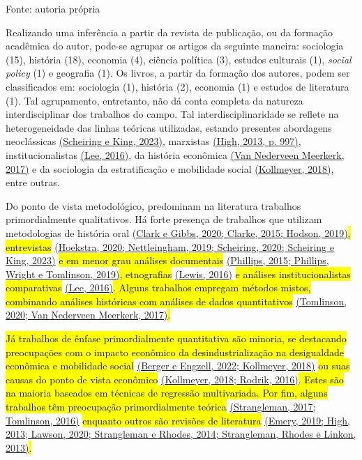 Fonte: autoria própria

Realizando uma inferência a partir da revista de publicação, ou da
formação acadêmica do autor, pode-se agrupar os artigos da seguinte
maneira: sociologia (15), história (18), economia (4), ciência política
(3), estudos culturais (1), \emph{social policy} (1) e geografia (1). Os
livros, a partir da formação dos autores, podem ser classificados em:
sociologia (1), história (2), economia (1) e estudos de literatura (1).
Tal agrupamento, entretanto, não dá conta completa da natureza
interdisciplinar dos trabalhos do campo. Tal interdisciplinaridade se
reflete na heterogeneidade das linhas teóricas utilizadas, estando
presentes abordagens neoclássicas
\href{https://www.zotero.org/google-docs/?kkP1z2}{(Scheiring e King,
2023)}, marxistas
\href{https://www.zotero.org/google-docs/?t9NhX6}{(High, 2013, p. 997)},
institucionalistas
\href{https://www.zotero.org/google-docs/?VlDdus}{(Lee, 2016)}, da
história econômica
\href{https://www.zotero.org/google-docs/?TRqrV5}{(Van Nederveen
Meerkerk, 2017)} e da sociologia da estratificação e mobilidade social
\href{https://www.zotero.org/google-docs/?MEPAJj}{(Kollmeyer, 2018)},
entre outras.

Do ponto de vista metodológico, predominam na literatura trabalhos
primordialmente qualitativos. Há forte presença de trabalhos que
utilizam metodologias de história oral
\href{https://www.zotero.org/google-docs/?cIWlm8}{(Clark e Gibbs, 2020;
Clarke, 2015; Hodson, 2019)}\hl{, entrevistas}
\href{https://www.zotero.org/google-docs/?u1rytv}{(Hoekstra, 2020;
Nettleingham, 2019; Scheiring, 2020; Scheiring e King, 2023)} \hl{e em
menor grau análises documentais}
\href{https://www.zotero.org/google-docs/?kgYUU2}{(Phillips, 2015;
Phillips, Wright e Tomlinson, 2019)}\hl{, etnografias}
\href{https://www.zotero.org/google-docs/?yB9B2v}{(Lewis, 2016)} \hl{e
análises institucionalistas comparativas}
\href{https://www.zotero.org/google-docs/?rZVpjC}{(Lee, 2016)}\hl{.
Alguns trabalhos empregam métodos mistos, combinando análises históricas
com análises de dados quantitativos}
\href{https://www.zotero.org/google-docs/?CYu4MG}{(Tomlinson, 2020; Van
Nederveen Meerkerk, 2017)}\hl{.}

\hl{Já trabalhos de ênfase primordialmente quantitativa são minoria, se
destacando preocupações com o impacto econômico da desindustrialização
na desigualdade econômica e mobilidade social}
\href{https://www.zotero.org/google-docs/?hVR5XO}{(Berger e Engzell,
2022; Kollmeyer, 2018)} \hl{ou suas causas do ponto de vista econômico}
\href{https://www.zotero.org/google-docs/?odDWC6}{(Kollmeyer, 2018;
Rodrik, 2016)}\hl{. Estes são na maioria baseados em técnicas de
regressão multivariada. Por fim, alguns trabalhos têm preocupação
primordialmente teórica}
\href{https://www.zotero.org/google-docs/?aGjtPq}{(Strangleman, 2017;
Tomlinson, 2016)} \hl{enquanto outros são revisões de literatura}
\href{https://www.zotero.org/google-docs/?lTQk3H}{(Emery, 2019; High,
2013; Lawson, 2020; Strangleman e Rhodes, 2014; Strangleman, Rhodes e
Linkon, 2013)}\hl{.}

